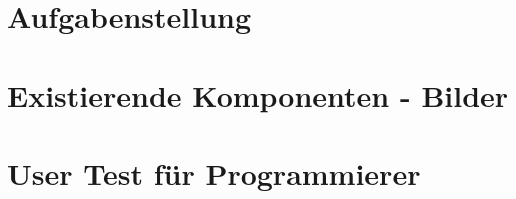 \chapter{Aufgabenstellung}



\chapter{Existierende Komponenten - Bilder}


\chapter{User Test für Programmierer}
